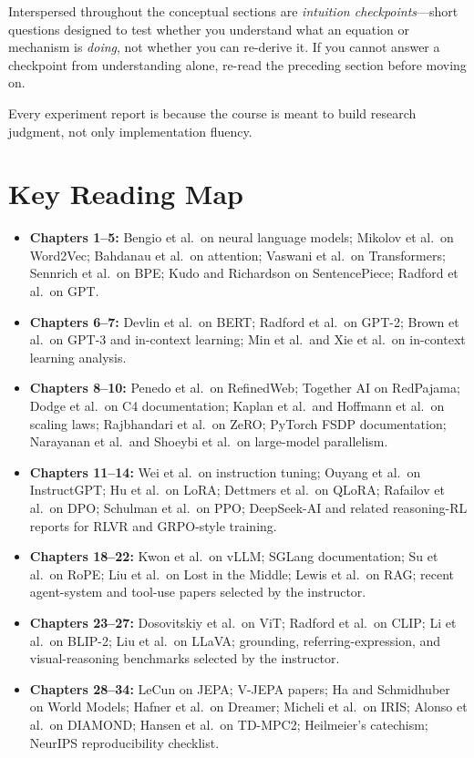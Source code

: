 Interspersed throughout the conceptual sections are \emph{intuition checkpoints}---short questions designed to test whether you understand what an equation or mechanism is \emph{doing}, not whether you can re-derive it. If you cannot answer a checkpoint from understanding alone, re-read the preceding section before moving on.

Every experiment report is \core{} because the course is meant to build research judgment, not only implementation fluency.

\chapter*{Key Reading Map}

\begin{itemize}
    \item \textbf{Chapters 1--5:} Bengio et al.\ on neural language models; Mikolov et al.\ on Word2Vec; Bahdanau et al.\ on attention; Vaswani et al.\ on Transformers; Sennrich et al.\ on BPE; Kudo and Richardson on SentencePiece; Radford et al.\ on GPT.
    \item \textbf{Chapters 6--7:} Devlin et al.\ on BERT; Radford et al.\ on GPT-2; Brown et al.\ on GPT-3 and in-context learning; Min et al.\ and Xie et al.\ on in-context learning analysis.
    \item \textbf{Chapters 8--10:} Penedo et al.\ on RefinedWeb; Together AI on RedPajama; Dodge et al.\ on C4 documentation; Kaplan et al.\ and Hoffmann et al.\ on scaling laws; Rajbhandari et al.\ on ZeRO; PyTorch FSDP documentation; Narayanan et al.\ and Shoeybi et al.\ on large-model parallelism.
    \item \textbf{Chapters 11--14:} Wei et al.\ on instruction tuning; Ouyang et al.\ on InstructGPT; Hu et al.\ on LoRA; Dettmers et al.\ on QLoRA; Rafailov et al.\ on DPO; Schulman et al.\ on PPO; DeepSeek-AI and related reasoning-RL reports for RLVR and GRPO-style training.
    \item \textbf{Chapters 18--22:} Kwon et al.\ on vLLM; SGLang documentation; Su et al.\ on RoPE; Liu et al.\ on Lost in the Middle; Lewis et al.\ on RAG; recent agent-system and tool-use papers selected by the instructor.
    \item \textbf{Chapters 23--27:} Dosovitskiy et al.\ on ViT; Radford et al.\ on CLIP; Li et al.\ on BLIP-2; Liu et al.\ on LLaVA; grounding, referring-expression, and visual-reasoning benchmarks selected by the instructor.
    \item \textbf{Chapters 28--34:} LeCun on JEPA; V-JEPA papers; Ha and Schmidhuber on World Models; Hafner et al.\ on Dreamer; Micheli et al.\ on IRIS; Alonso et al.\ on DIAMOND; Hansen et al.\ on TD-MPC2; Heilmeier's catechism; NeurIPS reproducibility checklist.
\end{itemize}
